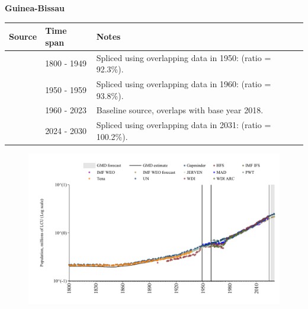\documentclass[12pt,a4paper,landscape]{article}
\begin{document}
\begin{adjustbox}{max totalsize={\paperwidth}{\paperheight},center}
\begin{minipage}[t][\textheight][t]{\textwidth}
\vspace*{0.5cm}
{}
\begin{center}
{\Large\bfseries Guinea-Bissau}
\end{center}
\vspace{0.5cm}
\begin{table}[H]
\centering
\small
\begin{tabular}{|l|l|l|}
\hline
\textbf{Source} & \textbf{Time span} & \textbf{Notes} \\
\hline
\rowcolor{white}\cite{Gapminder}& 1800 - 1949 &Spliced using overlapping data in 1950: (ratio = 92.3\%).\\
\rowcolor{lightgray}\cite{IMF_IFS}& 1950 - 1959 &Spliced using overlapping data in 1960: (ratio = 93.8\%).\\
\rowcolor{white}\cite{WDI}& 1960 - 2023 &Baseline source, overlaps with base year 2018.\\
\rowcolor{lightgray}\cite{Gapminder}& 2024 - 2030 &Spliced using overlapping data in 2031: (ratio = 100.2\%).\\
\hline
\end{tabular}
\end{table}
\begin{figure}[H]
\centering
\includegraphics[width=\textwidth,height=0.6\textheight,keepaspectratio]{graphs/GNB_pop.pdf}
\end{figure}
\end{minipage}
\end{adjustbox}
\end{document}
